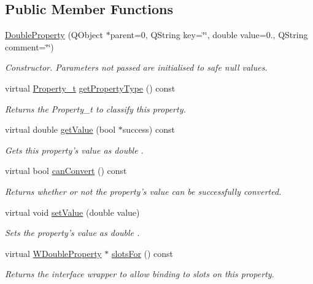 \subsection*{Public Member Functions}
\begin{DoxyCompactItemize}
\item 
\hyperlink{class_double_property_ad6db31eafe29ec0337a91b297b5648fa}{Double\-Property} (Q\-Object $\ast$parent=0, Q\-String key=\char`\"{}\char`\"{}, double value=0., Q\-String comment=\char`\"{}\char`\"{})
\begin{DoxyCompactList}\small\item\em Constructor. Parameters not passed are initialised to safe null values. \end{DoxyCompactList}\item 
virtual \hyperlink{group___property_classes_ga38f1ccddda12c7cb50b868c9f789ee37}{Property\-\_\-t} \hyperlink{class_double_property_a161c45cff47e246a6d27133562af064d}{get\-Property\-Type} () const 
\begin{DoxyCompactList}\small\item\em Returns the Property\-\_\-t to classify this property. \end{DoxyCompactList}\item 
virtual double \hyperlink{class_double_property_a9e196465f85c5fba581dc207dfd60eee}{get\-Value} (bool $\ast$success) const 
\begin{DoxyCompactList}\small\item\em Gets this property's value as double . \end{DoxyCompactList}\item 
virtual bool \hyperlink{class_double_property_a9ce3240555af31c5d4fbe9be33624637}{can\-Convert} () const 
\begin{DoxyCompactList}\small\item\em Returns whether or not the property's value can be successfully converted. \end{DoxyCompactList}\item 
virtual void \hyperlink{class_double_property_a1ae2a71c28ab126ac5eeceffdcdf4226}{set\-Value} (double value)
\begin{DoxyCompactList}\small\item\em Sets the property's value as double . \end{DoxyCompactList}\item 
virtual \hyperlink{class_w_double_property}{W\-Double\-Property} $\ast$ \hyperlink{class_double_property_a383b82607989d0a1abfd778ed7b30803}{slots\-For} () const 
\begin{DoxyCompactList}\small\item\em Returns the interface wrapper to allow binding to slots on this property. \end{DoxyCompactList}\end{DoxyCompactItemize}
